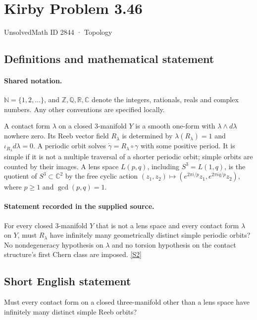 \documentclass[11pt]{article}
\newcommand{\sref}[2]{\hyperlink{source:#1:#2}{[S#2]}}
\begin{document}
\setcounter{section}{2843}
\section{Kirby Problem 3.46}\label{2844}
{\small\sffamily UnsolvedMath ID 2844 · Topology}
\subsection{Definitions and mathematical statement}

\paragraph{Shared notation.}$\mathbb N=\{1,2,\ldots\}$, and $\mathbb Z,\mathbb Q,\mathbb R,\mathbb C$ denote the integers, rationals, reals and complex numbers. Any other conventions are specified locally.


A contact form $\lambda$ on a closed $3$-manifold $Y$ is a smooth one-form with $\lambda\wedge d\lambda$ nowhere zero. Its Reeb vector field $R_\lambda$ is determined by $\lambda(R_\lambda)=1$ and $\iota_{R_\lambda}d\lambda=0$. A periodic orbit solves $\dot\gamma=R_\lambda\circ\gamma$ with some positive period. It is simple if it is not a multiple traversal of a shorter periodic orbit; simple orbits are counted by their images. A lens space $L(p,q)$, including $S^3=L(1,q)$, is the quotient of $S^3\subset\mathbb C^2$ by the free cyclic action $(z_1,z_2)\mapsto(e^{2\pi i/p}z_1,e^{2\pi iq/p}z_2)$, where $p\ge1$ and $\gcd(p,q)=1$.
\paragraph{Statement recorded in the supplied source.}
For every closed $3$-manifold $Y$ that is not a lens space and every contact form $\lambda$ on $Y$, must $R_\lambda$ have infinitely many geometrically distinct simple periodic orbits? No nondegeneracy hypothesis on $\lambda$ and no torsion hypothesis on the contact structure's first Chern class are imposed. \sref{2844}{2}
\subsection{Short English statement}
Must every contact form on a closed three-manifold other than a lens space have infinitely many distinct simple Reeb orbits?
\end{document}
